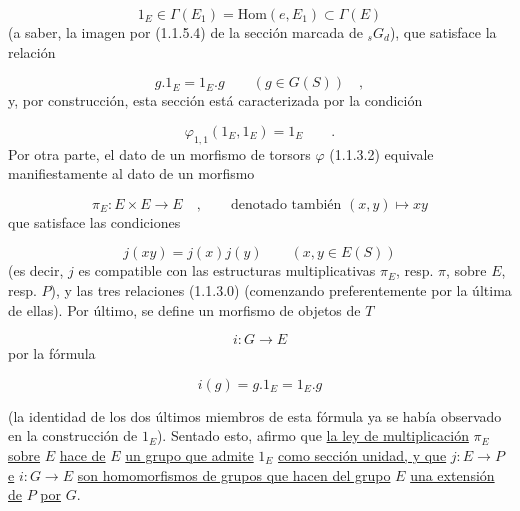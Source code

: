 \begin{equation}\tag{1.1.5.5}
1_E \in \Gamma(E_1) = \mathrm{Hom}(e,E_1) \subset \Gamma(E)
\end{equation}
(a saber, la imagen por (1.1.5.4) de la sección marcada de
${}_sG_d$), que satisface la relación

\begin{equation*}
g.1_E = 1_E.g \qquad (g \in G(S)) \quad ,
\end{equation*}
y, por construcción, esta sección está caracterizada por la condición

\begin{equation}\tag{1.1.5.6}
\varphi_{1,1}(1_E,1_E) = 1_E \qquad .
\end{equation}
Por otra parte, el dato de un morfismo de torsors $\varphi$ (1.1.3.2)
equivale manifiestamente al dato de un morfismo

\begin{equation}\tag{1.1.5.7}
\pi_E : E\times E \longrightarrow E \quad , \qquad \text{denotado también } (x,y) \longmapsto xy
\end{equation}
que satisface las condiciones

\begin{equation}\tag{1.1.5.8}
j(xy) = j(x)j(y) \qquad (x,y \in E(S))
\end{equation}
(es decir, $j$ es compatible con las estructuras multiplicativas
$\pi_E$, resp. $\pi$, sobre $E$, resp. $P$), y las tres relaciones
(1.1.3.0) (comenzando preferentemente por la última de ellas). Por
último, se define un morfismo de objetos de \underline{$T$}

\begin{equation*}
i : G \longrightarrow E
\end{equation*}
por la fórmula

\begin{equation}\tag{1.1.5.9}
i(g) = g.1_E = 1_E.g 
\end{equation}


(la identidad de los dos últimos miembros de esta fórmula ya se había
observado en la construcción de $1_E$). Sentado esto, afirmo que
\underline{la ley de multiplicación} $\pi_E$ \underline{sobre} $E$
\underline{hace de} $E$ \underline{un grupo que admite} $1_E$
\underline{como sección unidad, y que}
$j : E \rightarrow P$ \underline{e} $i : G \rightarrow E$
\underline{son homomorfismos de grupos que hacen del grupo} $E$
\underline{una extensión de} $P$ \underline{por} $G$.

